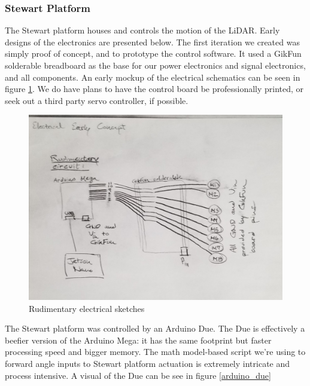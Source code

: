 \documentclass[a4paper, 10pt]{article}
\begin{document}
 		\subsubsection*{Stewart Platform}
 		The Stewart platform houses and controls the motion of the LiDAR. Early designs of the electronics are presented below. The first iteration we created was simply proof of concept, and to prototype the control software. It used a GikFun solderable breadboard as the base for our power electronics and signal electronics, and all components. An early mockup of the electrical schematics can be seen in figure \ref{basic_electrical}. We do have plans to have the control board be professionally printed, or seek out a third party servo controller, if possible.
 		
 		\begin{figure} [!h]
			\centering
			\includegraphics[scale=0.2]{Photos/early_electrical}
			\caption{Rudimentary electrical sketches}
			\label{basic_electrical}
		\end{figure}

 		The Stewart platform was controlled by an Arduino Due. The Due is effectively a beefier version of the Arduino Mega: it has the same footprint but faster processing speed and bigger memory. The math model-based script we're using to forward angle inputs to Stewart platform actuation is extremely intricate and process intensive. A visual of the Due can be see in figure \ref{arduino_due}
 		
\end{document}
